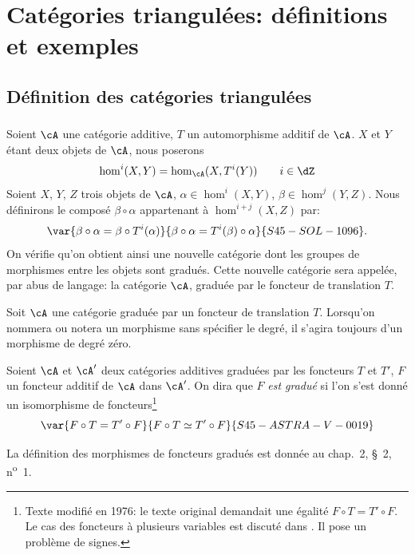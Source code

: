 \section{Catégories triangulées: définitions et exemples}\label{VIII:1}





\subsection{Définition des catégories triangulées}\label{VIII:1-1}


\addtocounter{subsubsection}{-1}
\subsubsection{}\label{VIII:1-1-0}

Soient $\cA$ une catégorie additive, $T$ un automorphisme additif de $\cA$. 
$X$ et $Y$ étant deux objets de $\cA$, nous poserons 
\[
  \hom^i(X,Y) = \hom_\cA(X,T^i(Y)) \qquad i\in \dZ 
\]
Soient $X$, $Y$, $Z$ trois objets de $\cA$, $\alpha\in \hom^i(X,Y)$, 
$\beta\in \hom^j(Y,Z)$. Nous définirons le composé $\beta\circ\alpha$ 
appartenant à $\hom^{i+j}(X,Z)$ par: 
\[
  \var{\beta\circ \alpha = \beta\circ T^i(\alpha)}{\beta\circ \alpha = T^i(\beta)\circ\alpha}{S45-SOL-1096} \text{.}
\]
On vérifie qu'on obtient ainsi une nouvelle catégorie dont les groupes de 
morphismes entre les objets sont gradués. Cette nouvelle catégorie sera 
appelée, par abus de langage: la catégorie $\cA$, graduée par le foncteur 
de translation $T$. 

Soit $\cA$ une catégorie graduée par un foncteur de translation $T$. 
Lorsqu'on nommera ou notera un morphisme sans spécifier le degré, il 
s'agira toujours d'un morphisme de degré zéro. 

Soient $\cA$ et $\cA'$ deux catégories additives graduées par les foncteurs
$T$ et $T'$, $F$ un foncteur additif de $\cA$ dans $\cA'$. On dira que $F$ 
\emph{est gradué} si l'on s'est donné un isomorphisme de 
foncteurs\footnote{Texte modifié en 1976: le texte original demandait une 
égalité $F\circ T=T'\circ F$. Le cas des foncteurs à plusieurs variables 
est discuté dans \cite[XVII 0.3]{sga4}. Il pose un problème de signes.} 
\[
  \var{F\circ T = T'\circ F}{F\circ T \simeq T'\circ F}{S45-ASTRA-V-0019} 
\]

La définition des morphismes de foncteurs gradués est donnée au 
chap.~2, \S~2, n\textsuperscript{o}~1. 

